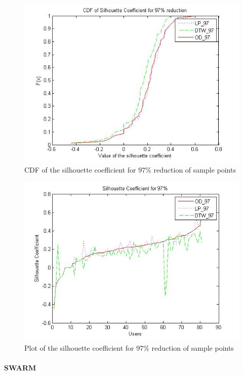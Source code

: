 \begin{itemize}
\begin{figure}
\centering     
\includegraphics[scale=0.3]{figs/noise_97_cdf.jpg}
\caption{CDF of the silhouette coefficient for 97\% reduction of sample points }
\label{fig:noise_97_cdf}  
\end{figure}

\begin{figure}
\centering     
\includegraphics[scale=0.3]{figs/noise_97_sil.jpg}
\caption{Plot of the silhouette coefficient for 97\% reduction of sample points }
\label{fig:noise_97_sil}  
\end{figure}

\end{itemize}

\paragraph{SWARM}


